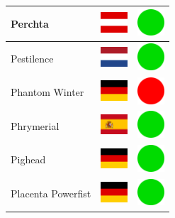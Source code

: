 \documentclass[12pt, a4paper, twoside]{report}
\begin{document}
\begin{center}
\begin{longtable}{|p{5cm}|p{2cm}|p{2cm}|}
Perchta & \includegraphics[width=1cm]{4x3/at} & \includegraphics[width=1cm]{likes/y} \\ \hline
Pestilence & \includegraphics[width=1cm]{4x3/nl} & \includegraphics[width=1cm]{likes/y} \\ \hline
Phantom Winter & \includegraphics[width=1cm]{4x3/de} & \includegraphics[width=1cm]{likes/n} \\ \hline
Phrymerial & \includegraphics[width=1cm]{4x3/es} & \includegraphics[width=1cm]{likes/y} \\ \hline
Pighead & \includegraphics[width=1cm]{4x3/de} & \includegraphics[width=1cm]{likes/y} \\ \hline
Placenta Powerfist & \includegraphics[width=1cm]{4x3/de} & \includegraphics[width=1cm]{likes/y} \\ \hline

\end{longtable}
\end{center}
\end{document}
